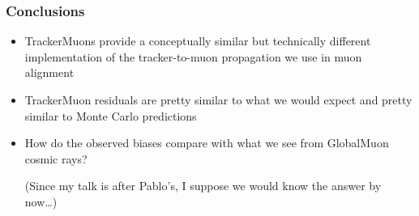 \documentclass[compress]{beamer}
\begin{document}

\begin{frame}
\frametitle{Conclusions}
\begin{itemize}\setlength{\itemsep}{0.75 cm}
\item TrackerMuons provide a conceptually similar but technically
  different implementation of the tracker-to-muon propagation we use
  in muon alignment

\item TrackerMuon residuals are pretty similar to what we would expect
  and pretty similar to Monte Carlo predictions

\item How do the observed biases compare with what we see from
  GlobalMuon cosmic rays?

(Since my talk is after Pablo's, I suppose we would know the answer by now\ldots)
\end{itemize}
\label{numpages}
\end{frame}
\end{document}
